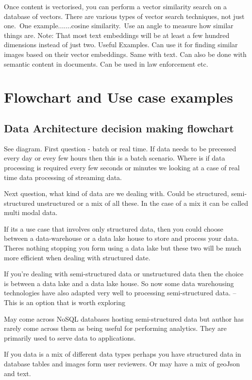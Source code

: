 \documentclass[a4paper, 11pt]{article}
\begin{document}
    Once content is vectorised, you can perform a vector similarity search on a database of vectors.
    There are various types of vector search techniques, not just one.\ One example.......cosine similarity.\ Use an angle to measure how similar things are.
    Note: That most text embeddings will be at least a few hundred dimensions instead of just two.
    Useful Examples.
    Can use it for finding similar images based on their vector embeddings.
    Same with text.
    Can also be done with semantic content in documents.
    Can be used in law enforcement etc.

    \section{Flowchart and Use case examples}

    \subsection{Data Architecture decision making flowchart}
    See diagram.
    First question - batch or real time.
    If data needs to be precessed every day or evey few hours then this is  a batch scenario.
    Where is if data processing is required every few seconds or minutes we looking at a case of real time data processing of streaming data.

    Next question, what kind of data are we dealing with.
    Could be structured, semi-structured unstructured or a mix of all these.
    In the case of a mix it can be called multi modal data.

    If its a use case that involves only structured data, then you could choose between a data-warehouse or a data lake house to store and process your data.
    Theres nothing stopping you form using a data lake but these two will be much more efficient when dealing with structured date.

    If you're dealing with semi-structured data or unstructured data then the choice is between a data lake and a data lake house.
    So now some data warehousing technologies have also adapted very well to processing semi-structured data.
    -- This is an option that is worth exploring

    May come across NoSQL databases hosting semi-structured data but author has rarely come across them as being useful for performing analytics.
    They are primarily used to serve data to applications.

    If you data is a mix of different data types perhaps you have structured data in database tables and images form user reviewers.
    Or may have a mix of geoJson and text.
\end{document}

